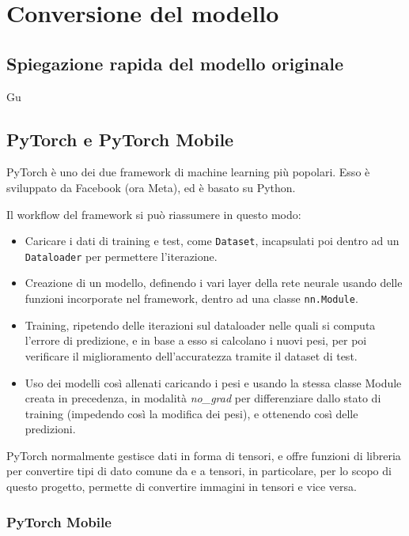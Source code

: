 \chapter{Conversione del modello}

\section{Spiegazione rapida del modello originale}

Gu

\section{PyTorch e PyTorch Mobile}

PyTorch è uno dei due framework di machine learning più popolari.
Esso è sviluppato da Facebook (ora Meta), ed è basato su Python.

Il workflow del framework si può riassumere in questo modo:

\begin{itemize}
    \item Caricare i dati di training e test, come \texttt{Dataset}, 
    incapsulati poi dentro ad un \texttt{Dataloader} per permettere l'iterazione.
    \item Creazione di un modello, definendo i vari layer della rete neurale usando
    delle funzioni incorporate nel framework, dentro ad una classe \texttt{nn.Module}.
    \item Training, ripetendo delle iterazioni sul dataloader nelle quali si computa
    l'errore di predizione, e in base a esso si calcolano i nuovi pesi, per poi verificare
    il miglioramento dell'accuratezza tramite il dataset di test.
    \item Uso dei modelli così allenati caricando i pesi e usando la stessa classe Module
    creata in precedenza, in modalità \emph{no\_grad} per differenziare dallo stato di
    training (impedendo così la modifica dei pesi), e ottenendo così delle predizioni.
\end{itemize}

PyTorch normalmente gestisce dati in forma di tensori, e offre funzioni di libreria per
convertire tipi di dato comune da e a tensori, in particolare, per lo scopo di questo
progetto, permette di convertire immagini in tensori e vice versa.

\subsection{PyTorch Mobile}

